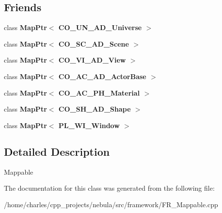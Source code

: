 \subsection*{\-Friends}
\begin{DoxyCompactItemize}
\item 
\hypertarget{classFramework_1_1Mappable_a7f695a559924d46020458f3fc321efde}{class {\bfseries \-Map\-Ptr$<$ C\-O\-\_\-\-U\-N\-\_\-\-A\-D\-\_\-\-Universe $>$}}\label{classFramework_1_1Mappable_a7f695a559924d46020458f3fc321efde}

\item 
\hypertarget{classFramework_1_1Mappable_a6735d57ad401d05b22b217f2c58b2479}{class {\bfseries \-Map\-Ptr$<$ C\-O\-\_\-\-S\-C\-\_\-\-A\-D\-\_\-\-Scene $>$}}\label{classFramework_1_1Mappable_a6735d57ad401d05b22b217f2c58b2479}

\item 
\hypertarget{classFramework_1_1Mappable_abae4aa5c8dece90757c1c9a67b34050d}{class {\bfseries \-Map\-Ptr$<$ C\-O\-\_\-\-V\-I\-\_\-\-A\-D\-\_\-\-View $>$}}\label{classFramework_1_1Mappable_abae4aa5c8dece90757c1c9a67b34050d}

\item 
\hypertarget{classFramework_1_1Mappable_aba02ca511fda8f3c7fbd83a7edcac581}{class {\bfseries \-Map\-Ptr$<$ C\-O\-\_\-\-A\-C\-\_\-\-A\-D\-\_\-\-Actor\-Base $>$}}\label{classFramework_1_1Mappable_aba02ca511fda8f3c7fbd83a7edcac581}

\item 
\hypertarget{classFramework_1_1Mappable_a2d107e44e6a5771950e1ed150713ec0d}{class {\bfseries \-Map\-Ptr$<$ C\-O\-\_\-\-A\-C\-\_\-\-P\-H\-\_\-\-Material $>$}}\label{classFramework_1_1Mappable_a2d107e44e6a5771950e1ed150713ec0d}

\item 
\hypertarget{classFramework_1_1Mappable_a40f525887485bc783467104a7aebc5a2}{class {\bfseries \-Map\-Ptr$<$ C\-O\-\_\-\-S\-H\-\_\-\-A\-D\-\_\-\-Shape $>$}}\label{classFramework_1_1Mappable_a40f525887485bc783467104a7aebc5a2}

\item 
\hypertarget{classFramework_1_1Mappable_af7d78cfc827d7e069c8a31e316b7d2fb}{class {\bfseries \-Map\-Ptr$<$ P\-L\-\_\-\-W\-I\-\_\-\-Window $>$}}\label{classFramework_1_1Mappable_af7d78cfc827d7e069c8a31e316b7d2fb}

\end{DoxyCompactItemize}


\subsection{\-Detailed \-Description}
\-Mappable 

\-The documentation for this class was generated from the following file\-:\begin{DoxyCompactItemize}
\item 
/home/charles/cpp\-\_\-projects/nebula/src/framework/\-F\-R\-\_\-\-Mappable.\-cpp\end{DoxyCompactItemize}
